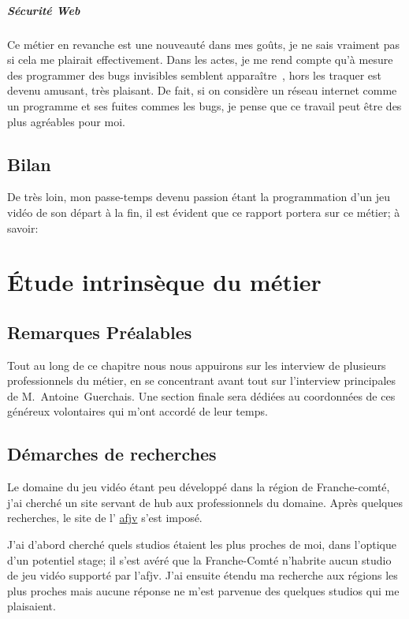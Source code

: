 \documentclass[12pt, a4paper]{report} %
\begin{document}
\paragraph{Sécurité Web}
Ce métier en revanche est une nouveauté dans mes goûts, je ne sais vraiment pas si cela me plairait effectivement. Dans les actes, je me rend compte qu'à mesure des programmer des bugs \og invisibles \fg{} semblent apparaître~, hors les traquer est devenu amusant, très plaisant. De fait, si on considère un réseau internet comme un programme et ses fuites commes les bugs, je pense que ce travail peut être des plus agréables pour moi.

\section{Bilan}
De très loin, mon passe-temps devenu passion étant la programmation d'un jeu vidéo de son départ à la fin, il est évident que ce rapport portera sur ce métier; à savoir: 


\chapter{Étude intrinsèque du métier }
\section*{Remarques Préalables}
Tout au long de ce chapitre nous nous appuirons sur les interview de plusieurs professionnels du métier, en se concentrant avant tout sur l'interview principales de M.~Antoine~Guerchais. Une section finale sera dédiées au coordonnées de ces généreux volontaires qui m'ont accordé de leur temps.

\section{Démarches de recherches}
Le domaine du jeu vidéo étant peu développé dans la région de Franche-comté, j'ai cherché un site servant de hub aux professionnels du domaine. Après quelques recherches, le site de l' \href{http://www.afjv.com/index.php}{\acrshort{afjv}} s'est imposé. 

J'ai d'abord cherché quels studios étaient les plus proches de moi, dans l'optique d'un potentiel stage; il s'est avéré que la Franche-Comté n'habrite aucun studio de jeu vidéo supporté par l'\acrshort{afjv}. J'ai ensuite étendu ma recherche aux régions les plus proches mais aucune réponse ne m'est parvenue des quelques studios qui me plaisaient.
\end{document}
